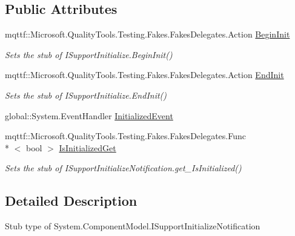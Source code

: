 \subsection*{Public Attributes}
\begin{DoxyCompactItemize}
\item 
mqttf\-::\-Microsoft.\-Quality\-Tools.\-Testing.\-Fakes.\-Fakes\-Delegates.\-Action \hyperlink{class_system_1_1_component_model_1_1_fakes_1_1_stub_i_support_initialize_notification_a702c2f100b205ac6cdafa2ace3c3565c}{Begin\-Init}
\begin{DoxyCompactList}\small\item\em Sets the stub of I\-Support\-Initialize.\-Begin\-Init()\end{DoxyCompactList}\item 
mqttf\-::\-Microsoft.\-Quality\-Tools.\-Testing.\-Fakes.\-Fakes\-Delegates.\-Action \hyperlink{class_system_1_1_component_model_1_1_fakes_1_1_stub_i_support_initialize_notification_af8bc513a8d557675185f9abcb19bae49}{End\-Init}
\begin{DoxyCompactList}\small\item\em Sets the stub of I\-Support\-Initialize.\-End\-Init()\end{DoxyCompactList}\item 
global\-::\-System.\-Event\-Handler \hyperlink{class_system_1_1_component_model_1_1_fakes_1_1_stub_i_support_initialize_notification_a47804cf8f1cd4efe7f857989cd205efa}{Initialized\-Event}
\item 
mqttf\-::\-Microsoft.\-Quality\-Tools.\-Testing.\-Fakes.\-Fakes\-Delegates.\-Func\\*
$<$ bool $>$ \hyperlink{class_system_1_1_component_model_1_1_fakes_1_1_stub_i_support_initialize_notification_a9c210333b205866faa7f11c657ec4203}{Is\-Initialized\-Get}
\begin{DoxyCompactList}\small\item\em Sets the stub of I\-Support\-Initialize\-Notification.\-get\-\_\-\-Is\-Initialized()\end{DoxyCompactList}\end{DoxyCompactItemize}


\subsection{Detailed Description}
Stub type of System.\-Component\-Model.\-I\-Support\-Initialize\-Notification



